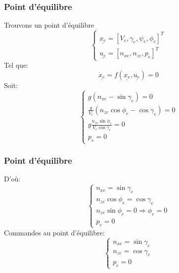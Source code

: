 \documentclass[footheight=2em]{beamer}
\begin{document}
\begin{frame}
    \frametitle{Point d'équilibre}\pause{}
    Trouvons un point d'équilibre
    \[
    \left \{
    \begin{array}{l}
        \underline{x_e} = {[V_e, \gamma_e, \psi_e, \phi_e]}^{T}\\
        \underline{u_e} = {[n_{xe}, n_{ze}, p_e]}^{T}
    \end{array}
    \right.
    \]
    Tel que:
    \[
    \underline{\dot{x}_e} = f(\underline{x_e}, \underline{u_e}) = 0
    \]\pause{}
    Soit:
    \[
    \left \{
    \begin{array}{l}
        g(n_{xe} - \sin \gamma_e) = 0\\
        \frac{g}{V_e}(n_{ze} \cos \phi_e - \cos \gamma_e) = 0\\
        g \frac{n_{ze} \sin \phi_e}{V_e \cos \gamma_e} = 0\\
        p_e = 0
    \end{array}
    \right.
    \]
\end{frame}

\begin{frame}
    \frametitle{Point d'équilibre}\pause{}
    D'où:
    \[
    \left \{
    \begin{array}{l}
        n_{xe} = \sin \gamma_e \\
        n_{ze} \cos \phi_e = \cos \gamma_e \\
        n_{ze} \sin \phi_e = 0 \Longrightarrow \phi_e = 0 \\
        p_e = 0
    \end{array}
    \right.
    \]\pause{}
    Commandes au point d'équilibre:
    \[\boxed
    {
        \left \{
        \begin{array}{l}
            n_{xe} = \sin \gamma_e \\
            n_{ze} = \cos \gamma_e \\
            p_e = 0
        \end{array}
        \right.
    }
    \]
\end{frame}
\end{document}
